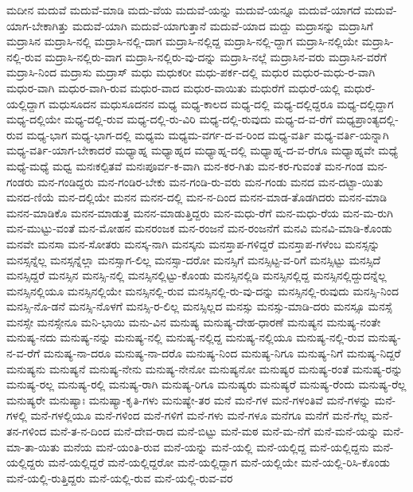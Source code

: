 {ಮದೀನ
ಮದುವೆ
ಮದುವೆ-ಮಾಡಿ
ಮದು-ವೆಯ
ಮದುವೆ-ಯನ್ನು
ಮದುವೆ-ಯನ್ನೂ
ಮದುವೆ-ಯಾಗದೆ
ಮದುವೆ-ಯಾಗ-ಬೇಕಾಗಿತ್ತು
ಮದುವೆ-ಯಾಗಿ
ಮದುವೆ-ಯಾಗುತ್ತಾನೆ
ಮದುವೆ-ಯಾದ
ಮದ್ದು
ಮದ್ರಾಸನ್ನು
ಮದ್ರಾಸಿಗೆ
ಮದ್ರಾಸಿನ
ಮದ್ರಾಸಿ-ನಲ್ಲಿ
ಮದ್ರಾಸಿ-ನಲ್ಲಿ-ದಾಗ
ಮದ್ರಾಸಿ-ನಲ್ಲಿದ್ದ
ಮದ್ರಾಸಿ-ನಲ್ಲಿ-ದ್ದಾಗ
ಮದ್ರಾಸಿ-ನಲ್ಲಿಯೇ
ಮದ್ರಾಸಿ-ನಲ್ಲಿ-ರುವ
ಮದ್ರಾಸಿ-ನಲ್ಲಿರು-ವಾಗ
ಮದ್ರಾಸಿ-ನಲ್ಲಿರು-ವು-ದನ್ನು
ಮದ್ರಾಸಿ-ನಲ್ಲೆ
ಮದ್ರಾಸಿನ-ವರು
ಮದ್ರಾಸಿನ-ವರೆಗೆ
ಮದ್ರಾಸಿ-ನಿಂದ
ಮದ್ರಾಸು
ಮದ್ರಾಸ್
ಮಧು
ಮಧುಕರೀ
ಮಧು-ಪರ್ಕ-ದಲ್ಲಿ
ಮಧುರ
ಮಧುರ-ಮಧು-ರ-ವಾಗಿ
ಮಧುರ-ವಾಗಿ
ಮಧುರ-ವಾಗಿ-ರುವ
ಮಧುರ-ವಾದ
ಮಧುರ-ವಾಯಿತು
ಮಧುರೆಗೆ
ಮಧುರೆ-ಯಲ್ಲಿ
ಮಧುರೆ-ಯಲ್ಲಿದ್ದಾಗ
ಮಧುಸೂದನ
ಮಧುಸೂದನನ
ಮಧ್ಯ
ಮಧ್ಯ-ಕಾಲದ
ಮಧ್ಯ-ದಲ್ಲಿ
ಮಧ್ಯ-ದಲ್ಲಿದ್ದರೂ
ಮಧ್ಯ-ದಲ್ಲಿದ್ದಾಗ
ಮಧ್ಯ-ದಲ್ಲಿಯೇ
ಮಧ್ಯ-ದಲ್ಲಿ-ರುವ
ಮಧ್ಯ-ದಲ್ಲಿ-ರು-ವಿರಿ
ಮಧ್ಯ-ದಲ್ಲಿ-ರುವುದು
ಮಧ್ಯ-ದ-ವ-ರೆಗೆ
ಮಧ್ಯಪ್ರಾಂತ್ಯದಲ್ಲಿ-ರುವ
ಮಧ್ಯ-ಭಾಗ
ಮಧ್ಯ-ಭಾಗ-ದಲ್ಲಿ
ಮಧ್ಯಮ
ಮಧ್ಯಮ-ವರ್ಗ-ದ-ವ-ರಿಂದ
ಮಧ್ಯ-ವರ್ತಿ
ಮಧ್ಯ-ವರ್ತಿ-ಯನ್ನಾಗಿ
ಮಧ್ಯ-ವರ್ತಿ-ಯಾಗ-ಬೇಕಾದರೆ
ಮಧ್ಯಾಹ್ನ
ಮಧ್ಯಾಹ್ನದ
ಮಧ್ಯಾಹ್ನ-ದಲ್ಲಿ
ಮಧ್ಯಾಹ್ನ-ದ-ವ-ರೆಗೂ
ಮಧ್ಯಾಹ್ನವೇ
ಮಧ್ಯೆ
ಮಧ್ಯೆ-ಮಧ್ಯೆ
ಮಧ್ವ
ಮನಃಕಲ್ಪಿತವೆ
ಮನಃಪೂರ್ವ-ಕ-ವಾಗಿ
ಮನ-ಕರ-ಗಿತು
ಮನ-ಕರ-ಗುವಂತೆ
ಮನ-ಗಂಡ
ಮನ-ಗಂಡರು
ಮನ-ಗಂಡಿದ್ದರು
ಮನ-ಗಂಡಿರ-ಬೇಕು
ಮನ-ಗಂಡಿ-ರು-ವರು
ಮನ-ಗಂಡು
ಮನದ
ಮನ-ದಟ್ಟಾ-ಯಿತು
ಮನದ-ಣಿಯೆ
ಮನ-ದಲ್ಲಿಯೇ
ಮನನ
ಮನನ-ದಲ್ಲಿ
ಮನ-ನ-ದಿಂದ
ಮನನ-ಮಾಡ-ತೊಡಗಿದರು
ಮನನ-ಮಾಡಿ
ಮನನ-ಮಾಡಿಕೊ
ಮನನ-ಮಾಡುತ್ತ
ಮನನ-ಮಾಡುತ್ತಿದ್ದರು
ಮನ-ಮಧು-ರೆಗೆ
ಮನ-ಮಧು-ರೆಯ
ಮನ-ಮ-ರುಗಿ
ಮನ-ಮುಟ್ಟು-ವಂತೆ
ಮನ-ಮೋಹನ
ಮನರಂಜಕ
ಮನ-ರಂಜನೆ
ಮನ-ರಂಜನೆಗೆ
ಮನವಿ
ಮನವಿ-ಮಾಡಿ-ಕೊಂಡು
ಮನವೇ
ಮನಸಾ
ಮನ-ಸೋತರು
ಮನಸ್ಕ-ನಾಗಿ
ಮನಸ್ಕನು
ಮನಸ್ತಾಪ-ಗಳಿದ್ದರೆ
ಮನಸ್ತಾಪ-ಗಳೆಂಬ
ಮನಸ್ಸನ್ನು
ಮನಸ್ಸನ್ನೆಲ್ಲ
ಮನಸ್ಸನ್ನೆಲ್ಲಾ
ಮನಸ್ಸಾಗ-ಲಿಲ್ಲ
ಮನಸ್ಸಾ-ದರೋ
ಮನಸ್ಸಿಗೆ
ಮನಸ್ಸಿಟ್ಟ-ವ-ರಿಗೆ
ಮನಸ್ಸಿಟ್ಟು
ಮನಸ್ಸಿದೆ
ಮನಸ್ಸಿದ್ದರೆ
ಮನಸ್ಸಿನ
ಮನಸ್ಸಿ-ನಲ್ಲಿ
ಮನಸ್ಸಿನಲ್ಲಿಟ್ಟು-ಕೊಂಡು
ಮನಸ್ಸಿನಲ್ಲಿಡಿ
ಮನಸ್ಸಿನಲ್ಲಿದ್ದ
ಮನಸ್ಸಿನಲ್ಲಿದ್ದುದನ್ನೆಲ್ಲ
ಮನಸ್ಸಿನಲ್ಲಿಯೂ
ಮನಸ್ಸಿನಲ್ಲಿಯೇ
ಮನಸ್ಸಿನಲ್ಲಿ-ರುವ
ಮನಸ್ಸಿನಲ್ಲಿ-ರು-ವು-ದನ್ನು
ಮನಸ್ಸಿನಲ್ಲಿ-ರುವುದು
ಮನಸ್ಸಿ-ನಿಂದ
ಮನಸ್ಸಿ-ನೊ-ಡನೆ
ಮನಸ್ಸಿ-ನೊಳಗೆ
ಮನಸ್ಸಿ-ರ-ಲಿಲ್ಲ
ಮನಸ್ಸಿಲ್ಲದ
ಮನಸ್ಸು
ಮನಸ್ಸು-ಮಾಡಿ-ದರು
ಮನಸ್ಸೂ
ಮನಸ್ಸೆ
ಮನಸ್ಸೇ
ಮನಸ್ಸೇನೂ
ಮನಿ-ಭಾಯಿ
ಮನು-ವಿನ
ಮನುಷ್ಯ
ಮನುಷ್ಯ-ದೇಹ-ಧಾರಣೆ
ಮನುಷ್ಯನ
ಮನುಷ್ಯ-ನಂತೇ
ಮನುಷ್ಯ-ನದು
ಮನುಷ್ಯ-ನನ್ನು
ಮನುಷ್ಯ-ನಲ್ಲಿ
ಮನುಷ್ಯ-ನಲ್ಲಿದ್ದ
ಮನುಷ್ಯ-ನಲ್ಲಿಯೂ
ಮನುಷ್ಯ-ನಲ್ಲಿ-ರುವ
ಮನುಷ್ಯ-ನ-ವ-ರೆಗೆ
ಮನುಷ್ಯ-ನಾ-ದರೂ
ಮನುಷ್ಯ-ನಾ-ದರೊ
ಮನುಷ್ಯ-ನಿಂದ
ಮನುಷ್ಯ-ನಿಗೂ
ಮನುಷ್ಯ-ನಿಗೆ
ಮನುಷ್ಯ-ನಿದ್ದರೆ
ಮನುಷ್ಯನು
ಮನುಷ್ಯನೆ
ಮನುಷ್ಯ-ನೇನು
ಮನುಷ್ಯ-ನೇನೋ
ಮನುಷ್ಯನೋ
ಮನುಷ್ಯರ
ಮನುಷ್ಯ-ರಂತೆ
ಮನುಷ್ಯ-ರನ್ನು
ಮನುಷ್ಯ-ರಲ್ಲ
ಮನುಷ್ಯ-ರಲ್ಲಿ
ಮನುಷ್ಯ-ರಾಗಿ
ಮನುಷ್ಯ-ರಿಗೂ
ಮನುಷ್ಯರು
ಮನುಷ್ಯರೆ
ಮನುಷ್ಯ-ರೆಂದು
ಮನುಷ್ಯ-ರೆಲ್ಲ
ಮನುಷ್ಯರೇ
ಮನುಷ್ಯಾಃ
ಮನುಷ್ಯಾ-ಕೃತಿ-ಗಳು
ಮನುಷ್ಯೇ-ತರ
ಮನೆ
ಮನೆ-ಗಳ
ಮನೆ-ಗಳಂತಿವೆ
ಮನೆ-ಗಳನ್ನು
ಮನೆ-ಗಳಲ್ಲಿ
ಮನೆ-ಗಳಲ್ಲಿಯೂ
ಮನೆ-ಗಳಿಂದ
ಮನೆ-ಗಳಿಗೆ
ಮನೆ-ಗಳು
ಮನೆ-ಗಳೂ
ಮನೆಗೂ
ಮನೆಗೆ
ಮನೆ-ಗೆಲ್ಲ
ಮನೆ-ತನ-ಗಳಿಂದ
ಮನೆ-ತ-ನ-ದಿಂದ
ಮನೆ-ದೇವ-ರಾದ
ಮನೆ-ಬಿಟ್ಟು
ಮನೆ-ಮಠ
ಮನೆ-ಮ-ನೆಗೆ
ಮನೆ-ಮನೆ-ಯನ್ನು
ಮನೆ-ಮಾ-ತಾ-ಯಿತು
ಮನೆಯ
ಮನೆ-ಯಂತಿ-ರುವ
ಮನೆ-ಯನ್ನು
ಮನೆ-ಯಲ್ಲಿ
ಮನೆ-ಯಲ್ಲಿದ್ದ
ಮನೆ-ಯಲ್ಲಿದ್ದನು
ಮನೆ-ಯಲ್ಲಿದ್ದರು
ಮನೆ-ಯಲ್ಲಿದ್ದರೆ
ಮನೆ-ಯಲ್ಲಿದ್ದರೋ
ಮನೆ-ಯಲ್ಲಿದ್ದಾಗ
ಮನೆ-ಯಲ್ಲಿಯೇ
ಮನೆ-ಯಲ್ಲಿ-ರಿಸಿ-ಕೊಂಡು
ಮನೆ-ಯಲ್ಲಿ-ರುತ್ತಿದ್ದರು
ಮನೆ-ಯಲ್ಲಿ-ರುವ
ಮನೆ-ಯಲ್ಲಿ-ರುವ-ವರ
}
